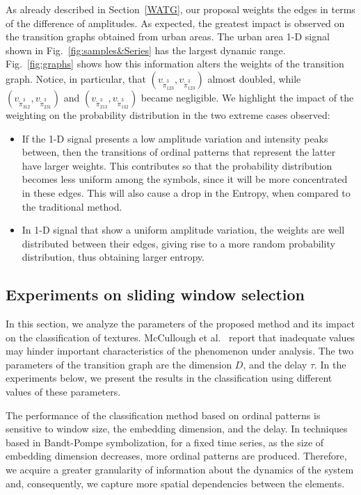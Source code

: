 \documentclass[journal]{IEEEtran}
\begin{document}
	As already described in Section~\ref{WATG}, our proposal weights the edges in terms of the difference of amplitudes.
	As expected, the greatest impact is observed on the transition graphs obtained from urban areas.
	The urban area \mbox{1-D} signal shown in Fig.~\ref{fig:samples&Series} has the largest dynamic range.
	Fig.~\ref{fig:graphs} shows how this information alters the weights of the transition graph.
	Notice, in particular, that 
	$(v_{\widetilde \pi^3_{123}}, v_{\widetilde \pi^3_{123}})$ almost doubled, while 
	$(v_{\widetilde \pi^3_{312}}, v_{\widetilde \pi^3_{231}})$ and $(v_{\widetilde \pi^3_{213}}, v_{\widetilde \pi^3_{132}})$ became negligible.
	We highlight the impact of the weighting on the probability distribution in the two extreme cases observed:
	\begin{itemize}
		\item If the \mbox{1-D} signal presents a low amplitude variation and intensity peaks between, then the transitions of ordinal patterns that represent the latter have larger weights.
		This contributes so that the probability distribution becomes less uniform among the symbols, since it will be more concentrated in these edges.
		This will also cause a drop in the Entropy, when compared to the traditional method.
		\item In \mbox{1-D} signal that show a uniform amplitude variation, the weights are well distributed between their edges, giving rise to a more random probability distribution, thus obtaining larger entropy.
	\end{itemize}
	
	\subsection{Experiments on sliding window selection}
	
	In this section, we analyze the parameters of the proposed method and its impact on the classification of textures.
	McCullough et al.~\cite{McCullough2015lagged} report that inadequate values may hinder important characteristics of the phenomenon under analysis.
	The two parameters of the transition graph are the dimension $D$, and the delay $\tau$.
	In the experiments below, we present the results in the classification using different values of these parameters.
	
	The performance of the classification method based on ordinal patterns is sensitive to window size, the embedding dimension, and the delay.
	In techniques based in Bandt-Pompe symbolization, for a fixed time series, as the size of embedding dimension decreases, more ordinal patterns are produced.
	Therefore, we acquire a greater granularity of information about the dynamics of the system and, consequently, we capture more spatial dependencies between the elements.
	
\end{document}
